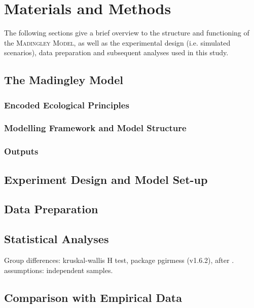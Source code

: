 \chapter{Materials and Methods}
\label{chap:mat}
The following sections give a brief overview to the    structure and functioning of the \textsc{Madingley Model}, as well as the experimental design (i.e. simulated scenarios), data preparation and subsequent analyses used in this study.
\section{The Madingley Model}
\label{chap:mat:madingley}

\subsection{Encoded Ecological Principles}
\label{chap:mat:madingley:princip}

\subsection{Modelling Framework and Model Structure}
\label{chap:mat:madingley:structure}

\subsection{Outputs}
\label{chap:mat:madingley:output}

\section{Experiment Design and Model Set-up}
\label{chap:mat:exp}

\section{Data Preparation}
\label{chap:mat:data}

\section{Statistical Analyses}
\label{chap:mat:stats}

Group differences: kruskal-wallis H test, package pgirmess (v1.6.2), after \cite{Siegel1988}. assumptions: independent samples.

\section{Comparison with Empirical Data}
\label{chap:mat:emp}

